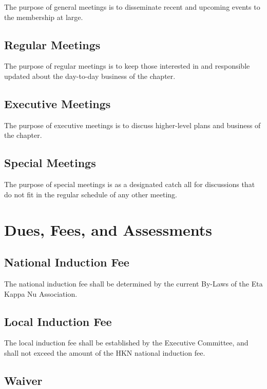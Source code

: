 \documentclass[11pt]{article}
\begin{document}
The purpose of general meetings is to disseminate recent and upcoming events to the membership at large.

\subsection{Regular Meetings}
\label{sec:orge3238b0}

The purpose of regular meetings is to keep those interested in and responsible updated about the day-to-day business of the chapter.

\subsection{Executive Meetings}
\label{sec:orgfca45a0}

The purpose of executive meetings is to discuss higher-level plans and business of the chapter.

\subsection{Special Meetings}
\label{sec:orgd8d8dd0}

The purpose of special meetings is as a designated catch all for discussions that do not fit in the regular schedule of any other meeting.
\section{Dues, Fees, and Assessments}
\label{sec:org9e507d0}

\subsection{National Induction Fee}
\label{sec:org77bb3e7}

The national induction fee shall be determined by the current By-Laws of the Eta Kappa Nu Association.

\subsection{Local Induction Fee}
\label{sec:org4020a1c}

The local induction fee shall be established by the Executive Committee, and shall not exceed the amount of the HKN national induction fee.

\subsection{Waiver}
\label{sec:org08a7fb0}
\end{document}
